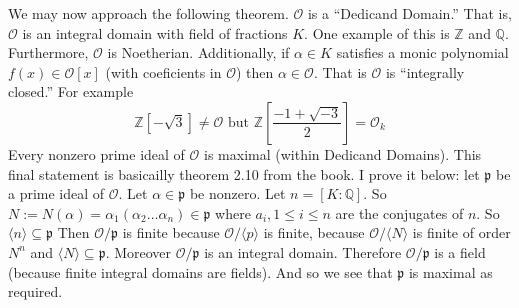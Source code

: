 \documentclass{article}
\begin{document}
We may now approach the following theorem. $\mathcal{O}$ is a ``Dedicand
Domain.'' That is, $\mathcal{O}$ is an integral domain with field of fractions
$K$. One example of this is $\mathbb{Z}$ and $\mathbb{Q}$. Furthermore,
$\mathcal{O}$ is Noetherian. Additionally, if $\alpha \in K$ satisfies a monic
polynomial $f(x)\in \mathcal{O}[x]$ (with coeficients in $\mathcal{O}$) then
$\alpha \in \mathcal{O}$. That is $\mathcal{O}$ is ``integrally closed.'' For example
\[ \mathbb{Z} [-\sqrt{3}] \neq \mathcal{O} \text{ but }
\mathbb{Z}\left[\frac{-1+\sqrt{-3}}{2}\right]=\mathcal{O}_k \]
Every nonzero prime ideal of $\mathcal{O}$ is maximal (within Dedicand Domains).
This final statement is basicailly theorem 2.10 from the book. I prove it below:
let $\mathfrak{p}$ be a prime ideal of $\mathcal{O}$. Let $\alpha \in
\mathfrak{p}$ be nonzero. Let $n = [K:\mathbb{Q}]$. So $N := N(\alpha) =
\alpha_1(\alpha_2\ldots\alpha_n) \in \mathfrak{p}$ where $a_i, 1\leq i \leq n$
are the conjugates of $n$. So $\langle n \rangle \subseteq \mathfrak{p}$ Then 
$\mathcal{O}/\mathfrak{p}$ is finite because $\mathcal{O}/\langle p \rangle$
is finite, because $\mathcal{O} / \langle N \rangle$ is finite of order $N^n$
and $\langle N \rangle \subseteq \mathfrak{p}$. Moreover
$\mathcal{O}/\mathfrak{p}$ is an integral domain. Therefore
$\mathcal{O}/\mathfrak{p}$ is a field (because finite integral domains are
fields). And so we see that $\mathfrak{p}$ is maximal as required. 
\end{document}
